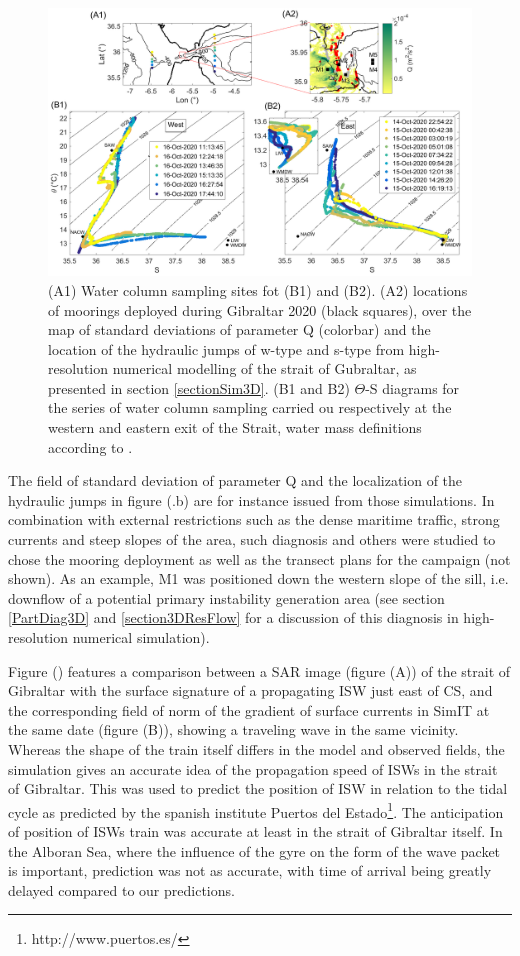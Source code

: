  
\begin{figure}[!h]
 \includegraphics[width=\textwidth]{./GBR3D/Fig_Moor.png}
 \caption {(A1) Water column sampling sites fot (B1) and (B2). (A2) locations of moorings deployed during Gibraltar 2020 (black squares), over the map of standard deviations of parameter Q (colorbar) and the location of the hydraulic jumps of w-type and s-type from high-resolution numerical modelling of the strait of Gubraltar, as presented in section \ref{sectionSim3D}. (B1 and B2) $\Theta$-S diagrams for the series of water column sampling carried ou respectively at the western and eastern exit of the Strait, water mass definitions according to \citet{najanro_2015}.}
 \label{fig_moor}
\end{figure}

The field of standard deviation of parameter Q and the localization of the hydraulic jumps in figure (.b) are for instance issued from those simulations. In combination with external restrictions such as the dense maritime traffic, strong currents and steep slopes of the area, such diagnosis and others were studied to chose the mooring deployment as well as the transect plans for the campaign (not shown). As an example, M1 was positioned down the western slope of the sill, i.e. downflow of a potential primary instability generation area (see section \ref{PartDiag3D} and \ref{section3DResFlow} for a discussion of this diagnosis in high-resolution numerical simulation).

Figure () features a comparison between a SAR image (figure (A)) of the strait of Gibraltar with the surface signature of a propagating ISW just east of CS, and the corresponding field of norm of the gradient of surface currents in SimIT at the same date (figure (B)), showing a traveling wave in the same vicinity. Whereas the shape of the train itself differs in the model and observed fields, the simulation gives an accurate idea of the propagation speed of ISWs in the strait of Gibraltar. This was used to predict the position of ISW in relation to the tidal cycle as predicted by the spanish institute Puertos del Estado\footnote{http://www.puertos.es/}. The anticipation of position of ISWs train was accurate at least in the strait of Gibraltar itself. In the Alboran Sea, where the influence of the gyre on the form of the wave packet is important, prediction was not as accurate, with time of arrival being greatly delayed compared to our predictions. 

